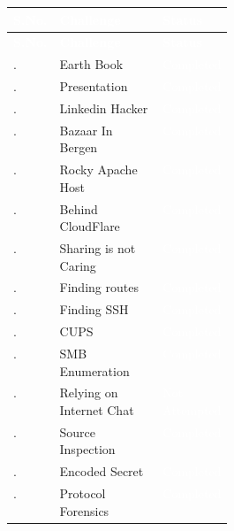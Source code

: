\documentclass[11pt]{article}
\begin{document}
\vspace{1.2em}
\renewcommand{\arraystretch}{1.5}
\noindent
\begin{xltabular}{\linewidth}{|>{\centering\arraybackslash}p{0.09\linewidth}|X|>{\centering\arraybackslash}p{0.20\linewidth}|}
\hline
{}
\textcolor{white}{\textbf{S.No.}} & \textcolor{white}{\textbf{Challenge}} & \textcolor{white}{\textbf{Status}} \\
\hline
\endfirsthead
\hline
{}
\textcolor{white}{\textbf{S.No.}} & \textcolor{white}{\textbf{Challenge}} & \textcolor{white}{\textbf{Status}} \\
\hline
{}. & Earth Book & \textcolor{white}{Completed} \\
. & Presentation & \textcolor{white}{Completed} \\
. & Linkedin Hacker & \textcolor{white}{Completed} \\
. & Bazaar In Bergen & \textcolor{white}{Completed} \\
. & Rocky Apache Host & \textcolor{white}{Completed} \\
. & Behind CloudFlare & \textcolor{white}{Completed} \\
. & Sharing is not Caring & \textcolor{white}{Completed} \\
. & Finding routes & \textcolor{white}{Completed} \\
. & Finding SSH & \textcolor{white}{Completed} \\
. & CUPS & \textcolor{white}{Completed} \\
. & SMB Enumeration & \textcolor{white}{Completed} \\
. & Relying on Internet Chat & \textcolor{white}{Not Attempted} \\
. & Source Inspection & \textcolor{white}{Completed} \\
. & Encoded Secret & \textcolor{white}{Completed} \\
. & Protocol Forensics & \textcolor{white}{Completed} \\
\hline

\end{xltabular}
\end{document}
